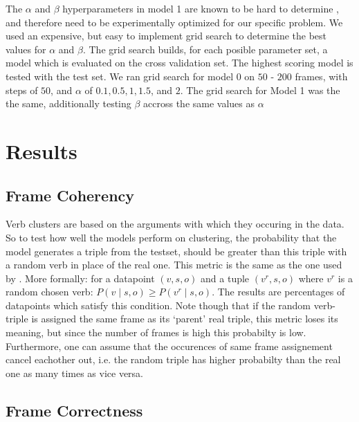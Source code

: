 \documentclass{article} %
\begin{document}
The $\alpha$ and $\beta$ hyperparameters in model 1 are known  to be hard to determine \citep{oconnor2013}, and therefore need to be experimentally optimized for our specific problem. We used an expensive, but easy to implement grid search to determine the best values for $\alpha$ and $\beta$. The grid search builds, for each posible parameter set, a model which is evaluated on the cross validation set. The highest scoring model is tested with the test set. We ran grid search for model 0 on $50$ - $200$ frames, with steps of $50$, and $\alpha$ of $0.1, 0.5, 1, 1.5$, and $2$. The grid search for Model 1 was the the same, additionally testing $\beta$ accross the same values as $\alpha$
\section{Results}
\label{results}

\subsection{Frame Coherency}
Verb clusters are based on the arguments with which they occuring in the data. So to test how well the models perform on clustering, the probability that the model generates a triple from the testset, should be greater than this triple with a random verb in place of the real one. This metric is the same as the one used by \citeauthor{rooth1999}. More formally: for a datapoint $(v,s,o)$ and a tuple $(v^r,s,o)$ where $v^r$ is a random chosen verb: $P(v\mid s,o) \geq P(v^r\mid s,o)$.
The results are percentages of datapoints which satisfy this condition. Note though that if the random verb-triple is assigned the same frame as its `parent' real triple, this metric loses its meaning, but since the number of frames is high this probabilty is low. Furthermore, one can assume that the occurences of same frame assignement cancel eachother out, i.e. the random triple has higher probabilty than the real one as many times as vice versa.

\subsection{Frame Correctness}
\end{document}
